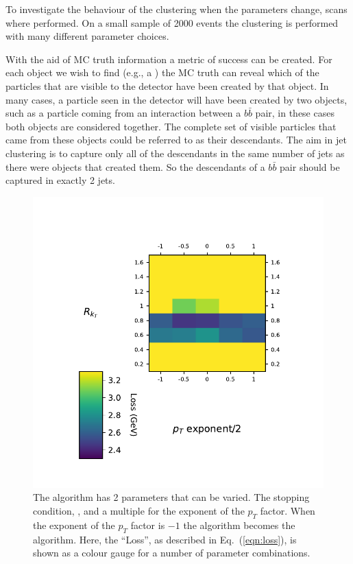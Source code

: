 To investigate the behaviour of the clustering when the parameters change, scans where performed.
On a small sample of 2000 events  the clustering is performed with many different parameter choices.

With the aid of MC truth information a metric of success can be created.
For each object we wish to find (e.g., a ) 
the MC truth can reveal which of the particles that are visible to the detector have
been created by that object.
In many cases, a particle seen in the detector will have been created by two objects,
such as a particle coming from an interaction between a \(b\bar{b}\) pair,
in these cases both objects are considered together.
The complete set of visible particles that came from these objects could be referred to as their descendants.
The aim in jet clustering is to capture only all of the descendants in the same number of jets as there were objects that created them.
So the descendants of a \(b\bar{b}\) pair should be captured in exactly 2 jets.

    \begin{figure}[!t]
        \begin{minipage}[c]{0.6\textwidth}
            \includegraphics[width=1\textwidth]{graphics/trangle_scan_genkt}
        \end{minipage}\hfill
        \begin{minipage}[c]{0.35\textwidth}
            \caption{The \genkt{} algorithm has 2 parameters that can be varied.
                The stopping condition, \ktstoppingdeltar{}, and a multiple for the exponent of the \(p_T\) factor.
                When the exponent of the \(p_T\) factor is \(-1\) the algorithm becomes the \antikt{} algorithm.
                Here, the ``Loss'', as described in Eq.~(\ref{eqn:loss}), is shown as a colour gauge for a number of parameter combinations.
             }\label{fig:scan_genkt}
        \end{minipage}
    \end{figure}    

